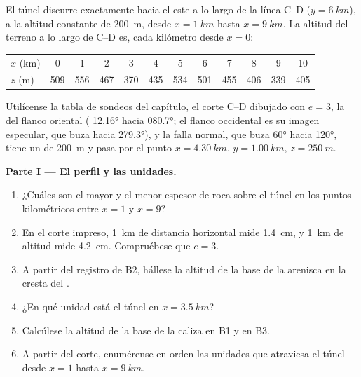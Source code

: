 \begin{problem}
\label{pb:b1:cross-sections:1}
El túnel discurre exactamente hacia el este a lo largo de la línea C--D ($y = \qty{6}{km}$), a la
altitud constante de \qty{200}{m}, desde $x = \qty{1}{km}$ hasta $x =
\qty{9}{km}$. La altitud del terreno a lo largo de C--D es, cada kilómetro
desde
$x = 0$:
\begin{center}
\small
\begin{tabular}{lccccccccccc}
\hline
$x$ (km) & 0 & 1 & 2 & 3 & 4 & 5 & 6 & 7 & 8 & 9 & 10 \\
$z$ (m) & 509 & 556 & 467 & 370 & 435 & 534 & 501 & 455 & 406 & 339 & 405 \\
\hline
\end{tabular}
\end{center}
Utilícense la tabla de sondeos del capítulo, el corte C--D dibujado con $e = 3$, la  del
flanco oriental ( \ang{12.16} hacia \ang{080.7}; el flanco occidental es su imagen
especular, que buza hacia \ang{279.3}), y la falla normal, que buza \ang{60} hacia \ang{120}, tiene
un  de \qty{200}{m} y pasa por el punto $x = \qty{4.30}{km}$, $y = \qty{1.00}{km}$,
$z = \qty{250}{m}$.

\medskip
\noindent\textbf{Parte I --- El perfil y las unidades.}
\begin{enumerate}
  \item ¿Cuáles son el mayor y el menor espesor de roca sobre el túnel en los puntos kilométricos
        entre $x = 1$ y $x = 9$?
  \item En el corte impreso, \qty{1}{km} de distancia horizontal mide \qty{1.4}{cm}, y \qty{1}{km}
        de altitud mide \qty{4.2}{cm}. Compruébese que $e = 3$.
  \item A partir del registro de B2, hállese la altitud de la base de la arenisca en la cresta del
        .
  \item ¿En qué unidad está el túnel en $x = \qty{3.5}{km}$?
  \item Calcúlese la altitud de la base de la caliza en B1 y en B3.
  \item A partir del corte, enumérense en orden las unidades que atraviesa el túnel desde $x = 1$
        hasta $x = \qty{9}{km}$.
\end{enumerate}


\end{problem}
